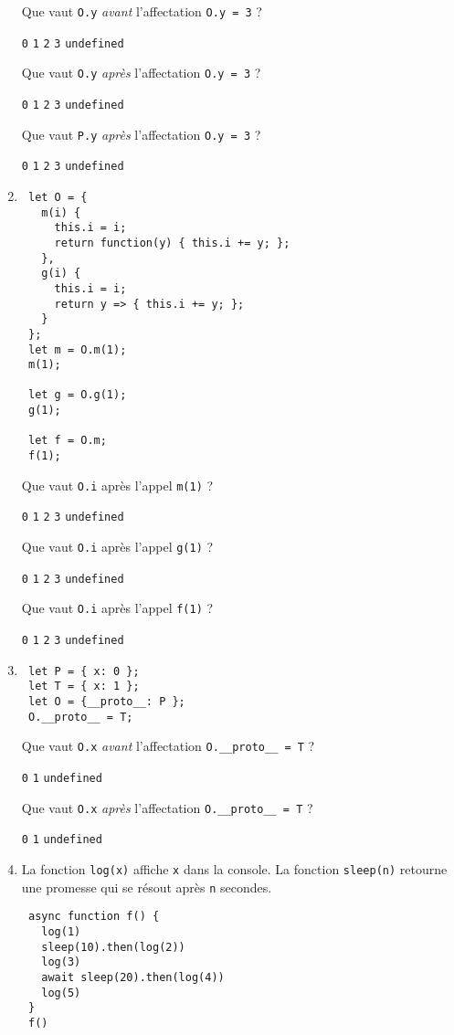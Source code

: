 \documentclass[a4paper, 12pt]{article}
\newcommand{\choicec}[1]{\Square\hspace{2pt} \lstinline{#1}\hspace{5pt}}
\begin{document}
\begin{enumerate}
  Que vaut \lstinline{O.y} \emph{avant} l'affectation \lstinline{O.y = 3} ?

  \choicec{0} \choicec{1} \choicec{2} \choicec{3} \choicec{undefined}

  Que vaut \lstinline{O.y} \emph{après} l'affectation \lstinline{O.y = 3} ?

  \choicec{0} \choicec{1} \choicec{2} \choicec{3} \choicec{undefined}

  Que vaut \lstinline{P.y} \emph{après} l'affectation \lstinline{O.y = 3} ?

  \choicec{0} \choicec{1} \choicec{2} \choicec{3} \choicec{undefined}
\item \begin{lstlisting}
 let O = {
   m(i) {
     this.i = i;
     return function(y) { this.i += y; };
   },
   g(i) {
     this.i = i;
     return y => { this.i += y; };
   }
 };
 let m = O.m(1);
 m(1);

 let g = O.g(1);
 g(1);

 let f = O.m;
 f(1);
\end{lstlisting}

  Que vaut \lstinline{O.i} après l'appel \lstinline{m(1)} ?

  \choicec{0} \choicec{1} \choicec{2} \choicec{3} \choicec{undefined}

  Que vaut \lstinline{O.i} après l'appel \lstinline{g(1)} ?

  \choicec{0} \choicec{1} \choicec{2} \choicec{3} \choicec{undefined}

  Que vaut \lstinline{O.i} après l'appel \lstinline{f(1)} ?

  \choicec{0} \choicec{1} \choicec{2} \choicec{3} \choicec{undefined}
\item \begin{lstlisting}
 let P = { x: 0 };
 let T = { x: 1 };
 let O = {__proto__: P };
 O.__proto__ = T;
\end{lstlisting}

  Que vaut \lstinline{O.x} \emph{avant} l'affectation \lstinline{O.__proto__ = T} ?

  \choicec{0} \choicec{1} \choicec{undefined}

  Que vaut \lstinline{O.x} \emph{après} l'affectation \lstinline{O.__proto__ = T} ?

  \choicec{0} \choicec{1} \choicec{undefined}
\item La fonction \lstinline{log(x)} affiche \lstinline{x} dans la console.  La
  fonction \lstinline{sleep(n)} retourne une promesse qui se résout après
  \lstinline{n} secondes.
  \begin{lstlisting}
 async function f() {
   log(1)
   sleep(10).then(log(2))
   log(3)
   await sleep(20).then(log(4))
   log(5)
 }
 f()
\end{lstlisting}


\end{enumerate}
\end{document}

